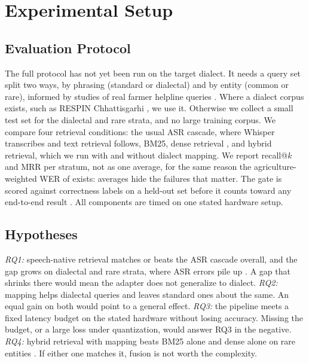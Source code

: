 \documentclass[conference]{IEEEtran}
\begin{document}
\section{Experimental Setup}\label{sec:setup}

\subsection{Evaluation Protocol}\label{sec:protocol}
The full protocol has not yet been run on the target dialect. It needs a query set split two ways, by phrasing (standard or dialectal) and by entity (common or rare), informed by studies of real farmer helpline queries \cite{godara2022querycount,godara2020sequentialpattern}. Where a dialect corpus exists, such as RESPIN Chhattisgarhi \cite{singh2023respin}, we use it. Otherwise we collect a small test set for the dialectal and rare strata, and no large training corpus. We compare four retrieval conditions: the usual ASR cascade, where Whisper \cite{radford2023whisper} transcribes and text retrieval follows, BM25, dense retrieval \cite{karpukhin2020dpr}, and hybrid retrieval, which we run with and without dialect mapping. We report recall@$k$ and MRR per stratum, not as one average, for the same reason the agriculture-weighted WER of \cite{benchmarkingasr2026} exists: averages hide the failures that matter. The gate is scored against correctness labels on a held-out set before it counts toward any end-to-end result \cite{dependablerag2026,intrygue2026}. All components are timed on one stated hardware setup.

\subsection{Hypotheses}
\textit{RQ1:} speech-native retrieval matches or beats the ASR cascade overall, and the gap grows on dialectal and rare strata, where ASR errors pile up \cite{benchmarkingasr2026,dialectmatters2026}. A gap that shrinks there would mean the adapter does not generalize to dialect. \textit{RQ2:} mapping helps dialectal queries and leaves standard ones about the same. An equal gain on both would point to a general effect. \textit{RQ3:} the pipeline meets a fixed latency budget on the stated hardware without losing accuracy. Missing the budget, or a large loss under quantization, would answer RQ3 in the negative. \textit{RQ4:} hybrid retrieval with mapping beats BM25 alone and dense alone on rare entities \cite{sultania2024hybridsearch}. If either one matches it, fusion is not worth the complexity.
\end{document}
